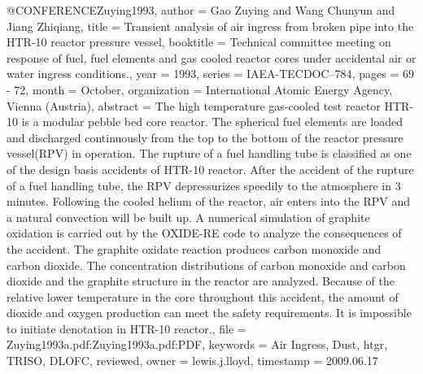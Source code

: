 {{@CONFERENCE{Zuying1993,
  author = {Gao Zuying and Wang Chunyun and Jiang Zhiqiang},
  title = {Transient analysis of air ingress from broken pipe into the HTR-10
	reactor pressure vessel},
  booktitle = {Technical committee meeting on response of fuel, fuel elements and
	gas cooled reactor cores under accidental air or water ingress conditions.},
  year = {1993},
  series = {IAEA-TECDOC--784},
  pages = {69 - 72},
  month = {October},
  organization = {International Atomic Energy Agency, Vienna (Austria)},
  abstract = {The high temperature gas-cooled test reactor HTR-10 is a modular pebble
	bed core reactor. The spherical fuel elements are loaded and discharged
	continuously from the top to the bottom of the reactor pressure vessel(RPV)
	in operation. The rupture of a fuel handling tube is classified as
	one of the design basis accidents of HTR-10 reactor. After the accident
	of the rupture of a fuel handling tube, the RPV depressurizes speedily
	to the atmosphere in 3 minutes. Following the cooled helium of the
	reactor, air enters into the RPV and a natural convection will be
	built up. A numerical simulation of graphite oxidation is carried
	out by the OXIDE-RE code to analyze the consequences of the accident.
	The graphite oxidate reaction produces carbon monoxide and carbon
	dioxide. The concentration distributions of carbon monoxide and carbon
	dioxide and the graphite structure in the reactor are analyzed. Because
	of the relative lower temperature in the core throughout this accident,
	the amount of dioxide and oxygen production can meet the safety requirements.
	It is impossible to initiate denotation in HTR-10 reactor.},
  file = {Zuying1993a.pdf:Zuying1993a.pdf:PDF},
  keywords = {Air Ingress, Dust, htgr, TRISO, DLOFC, reviewed},
  owner = {lewis.j.lloyd},
  timestamp = {2009.06.17}
}

}}
